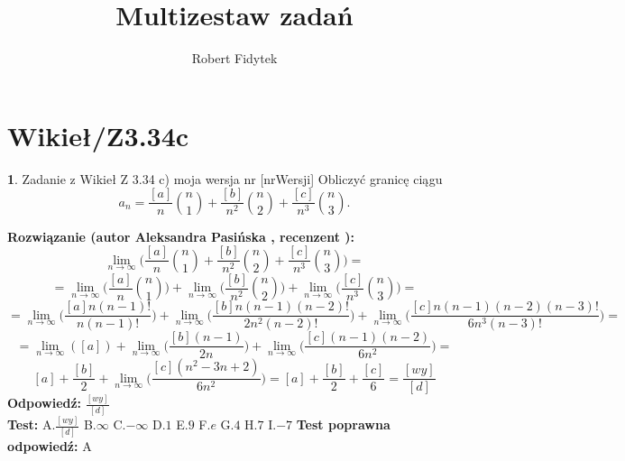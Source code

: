 \documentclass[12pt, a4paper]{article}
\title{Multizestaw zadań}
\author{Robert Fidytek}
\date{}
\theoremstyle{definition} %
\newtheorem{zad}{}
\newcommand{\kategoria}[1]{\section{#1}} %
\newcommand{\zadStart}[1]{\begin{zad}#1\newline} %
\newcommand{\zadStop}{\end{zad}}   %
\newcommand{\rozwStart}[2]{\noindent \textbf{Rozwiązanie (autor #1 , recenzent #2): }\newline} %
\newcommand{\rozwStop}{\newline}                                            %
\newcommand{\odpStart}{\noindent \textbf{Odpowiedź:}\newline}    %
\newcommand{\odpStop}{\newline}                                             %
\newcommand{\testStart}{\noindent \textbf{Test:}\newline} %
\newcommand{\testStop}{\newline} %
\newcommand{\kluczStart}{\noindent \textbf{Test poprawna odpowiedź:}\newline} %
\newcommand{\kluczStop}{\newline} %
\begin{document}
\maketitle


\kategoria{Wikieł/Z3.34c}
\zadStart{Zadanie z Wikieł Z 3.34 c) moja wersja nr [nrWersji]}
Obliczyć granicę ciągu $$a_n=\frac{[a]}{n}\binom{n}{1}+\frac{[b]}{n^2}\binom{n}{2}+\frac{[c]}{n^3}\binom{n}{3}.$$
\zadStop
\rozwStart{Aleksandra Pasińska}{}
$$\lim_{n\rightarrow \infty}\biggl(\frac{[a]}{n}\binom{n}{1}+\frac{[b]}{n^2}\binom{n}{2}+\frac{[c]}{n^3}\binom{n}{3}\biggr)=$$
$$=\lim_{n\rightarrow \infty}\biggl(\frac{[a]}{n}\binom{n}{1}\biggr)+\lim_{n\rightarrow \infty}\biggl(\frac{[b]}{n^2}\binom{n}{2}\biggr)+\lim_{n\rightarrow \infty}\biggl(\frac{[c]}{n^3}\binom{n}{3}\biggr)=$$
$$=\lim_{n\rightarrow \infty}\biggl(\frac{[a]n(n-1)!}{n(n-1)!}\biggr)+\lim_{n\rightarrow \infty}\biggl(\frac{[b]n(n-1)(n-2)!}{2n^2(n-2)!}\biggr)+\lim_{n\rightarrow \infty}\biggl(\frac{[c]n(n-1)(n-2)(n-3)!}{6n^3(n-3)!}\biggr)=$$
$$=\lim_{n\rightarrow \infty}([a])+\lim_{n\rightarrow \infty}\biggl(\frac{[b](n-1)}{2n}\biggr)+\lim_{n\rightarrow \infty}\biggl(\frac{[c](n-1)(n-2)}{6n^2}\biggr)=$$
$$[a]+\frac{[b]}{2}+\lim_{n\rightarrow \infty}\biggl(\frac{[c](n^2-3n+2)}{6n^2}\biggr)=[a]+\frac{[b]}{2}+\frac{[c]}{6}=\frac{[wy]}{[d]}$$
\rozwStop
\odpStart
$\frac{[wy]}{[d]}$\\
\odpStop
\testStart
A.$\frac{[wy]}{[d]}$
B.$\infty$
C.$-\infty$
D.$1$
E.$9$
F.$e$
G.$4$
H.$7$
I.$-7$
\testStop
\kluczStart
A
\kluczStop
\end{document}
